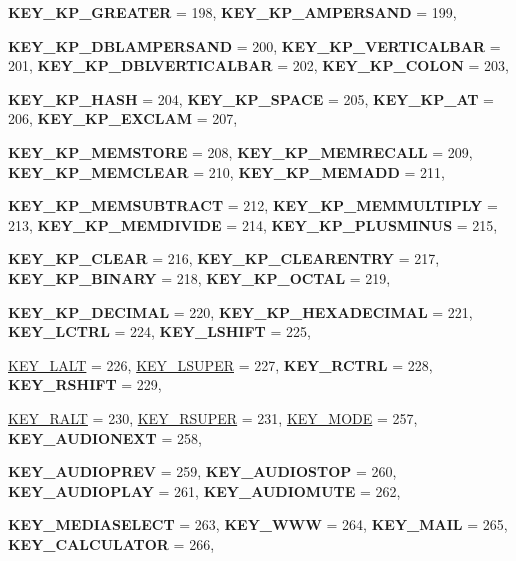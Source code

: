 \begin{DoxyCompactItemize}
{\bfseries KEY\_\-KP\_\-GREATER} =  198, 
{\bfseries KEY\_\-KP\_\-AMPERSAND} =  199, 
\par
{\bfseries KEY\_\-KP\_\-DBLAMPERSAND} =  200, 
{\bfseries KEY\_\-KP\_\-VERTICALBAR} =  201, 
{\bfseries KEY\_\-KP\_\-DBLVERTICALBAR} =  202, 
{\bfseries KEY\_\-KP\_\-COLON} =  203, 
\par
{\bfseries KEY\_\-KP\_\-HASH} =  204, 
{\bfseries KEY\_\-KP\_\-SPACE} =  205, 
{\bfseries KEY\_\-KP\_\-AT} =  206, 
{\bfseries KEY\_\-KP\_\-EXCLAM} =  207, 
\par
{\bfseries KEY\_\-KP\_\-MEMSTORE} =  208, 
{\bfseries KEY\_\-KP\_\-MEMRECALL} =  209, 
{\bfseries KEY\_\-KP\_\-MEMCLEAR} =  210, 
{\bfseries KEY\_\-KP\_\-MEMADD} =  211, 
\par
{\bfseries KEY\_\-KP\_\-MEMSUBTRACT} =  212, 
{\bfseries KEY\_\-KP\_\-MEMMULTIPLY} =  213, 
{\bfseries KEY\_\-KP\_\-MEMDIVIDE} =  214, 
{\bfseries KEY\_\-KP\_\-PLUSMINUS} =  215, 
\par
{\bfseries KEY\_\-KP\_\-CLEAR} =  216, 
{\bfseries KEY\_\-KP\_\-CLEARENTRY} =  217, 
{\bfseries KEY\_\-KP\_\-BINARY} =  218, 
{\bfseries KEY\_\-KP\_\-OCTAL} =  219, 
\par
{\bfseries KEY\_\-KP\_\-DECIMAL} =  220, 
{\bfseries KEY\_\-KP\_\-HEXADECIMAL} =  221, 
{\bfseries KEY\_\-LCTRL} =  224, 
{\bfseries KEY\_\-LSHIFT} =  225, 
\par
\hyperlink{classMezzanine_1_1MetaCode_a3b5633f0145bf3287cf53a3f05b5563ca0076a5c334ab65f0d387ce1c40f54942}{KEY\_\-LALT} =  226, 
\hyperlink{classMezzanine_1_1MetaCode_a3b5633f0145bf3287cf53a3f05b5563ca53c3a88dbf5dc88491bc2f0773a547f7}{KEY\_\-LSUPER} =  227, 
{\bfseries KEY\_\-RCTRL} =  228, 
{\bfseries KEY\_\-RSHIFT} =  229, 
\par
\hyperlink{classMezzanine_1_1MetaCode_a3b5633f0145bf3287cf53a3f05b5563ca9e02ef0a2eaff8b2a5386fc6ecae647a}{KEY\_\-RALT} =  230, 
\hyperlink{classMezzanine_1_1MetaCode_a3b5633f0145bf3287cf53a3f05b5563ca01e09d8de434e3fa0156286cd9937d5f}{KEY\_\-RSUPER} =  231, 
\hyperlink{classMezzanine_1_1MetaCode_a3b5633f0145bf3287cf53a3f05b5563ca2f97b1036c201d417b8d7ba4a6ca9aea}{KEY\_\-MODE} =  257, 
{\bfseries KEY\_\-AUDIONEXT} =  258, 
\par
{\bfseries KEY\_\-AUDIOPREV} =  259, 
{\bfseries KEY\_\-AUDIOSTOP} =  260, 
{\bfseries KEY\_\-AUDIOPLAY} =  261, 
{\bfseries KEY\_\-AUDIOMUTE} =  262, 
\par
{\bfseries KEY\_\-MEDIASELECT} =  263, 
{\bfseries KEY\_\-WWW} =  264, 
{\bfseries KEY\_\-MAIL} =  265, 
{\bfseries KEY\_\-CALCULATOR} =  266, 
\par

\end{DoxyCompactItemize}
